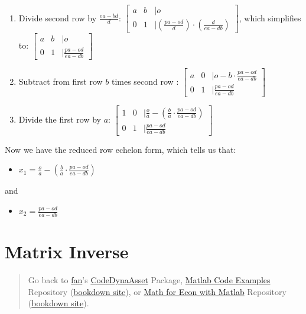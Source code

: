 \documentclass[
]{book}
\providecommand{\tightlist}{%
  \setlength{\itemsep}{0pt}\setlength{\parskip}{0pt}}
\begin{document}
\begin{enumerate}
\def\labelenumi{\arabic{enumi}.}
\item
  Divide second row by \(\frac{ea-bd}{d}\):
  \(\left\lbrack \begin{array}{ccl} a & b & |o\\ 0 & 1 & |\left(\frac{pa-od}{d}\right)\cdot \left(\frac{d}{ea-db}\right) \end{array}\right\rbrack\), which simplifies to:
  \(\left\lbrack \begin{array}{ccl} a & b & |o\\ 0 & 1 & |\frac{pa-od}{ea-db} \end{array}\right\rbrack\)
\item
  Subtract from first row \(b\) times second row :
  \(\left\lbrack \begin{array}{ccl} a & 0 & |o-b\cdot \frac{pa-od}{ea-db}\\ 0 & 1 & |\frac{pa-od}{ea-db} \end{array}\right\rbrack\)
\item
  Divide the first row by \(a\): \(\left\lbrack \begin{array}{ccl} 1 & 0 & |\frac{o}{a}-\left(\frac{b}{a}\cdot \frac{pa-od}{ea-db}\right)\\ 0 & 1 & |\frac{pa-od}{ea-db} \end{array}\right\rbrack\)
\end{enumerate}

Now we have the reduced row echelon form, which tells us that:

\begin{itemize}
\tightlist
\item
  \(\displaystyle x_1 =\frac{o}{a}-\left(\frac{b}{a}\cdot \frac{pa-od}{ea-db}\right)\)
\end{itemize}

and

\begin{itemize}
\tightlist
\item
  \(\displaystyle x_2 =\frac{pa-od}{ea-db}\)
\end{itemize}

\hypertarget{matrix-inverse}{%
\section{Matrix Inverse}\label{matrix-inverse}}

\begin{quote}
Go back to \href{http://fanwangecon.github.io/}{fan}'s \href{https://fanwangecon.github.io/CodeDynaAsset/}{CodeDynaAsset} Package, \href{https://fanwangecon.github.io/M4Econ/}{Matlab Code Examples} Repository (\href{https://fanwangecon.github.io/M4Econ/bookdown}{bookdown site}), or \href{https://fanwangecon.github.io/Math4Econ/}{Math for Econ with Matlab} Repository (\href{https://fanwangecon.github.io/Math4Econ/bookdown}{bookdown site}).
\end{quote}
\end{document}
